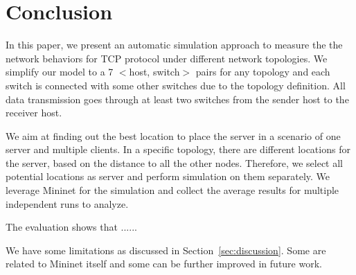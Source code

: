 \section{Conclusion} \label{sec:conclusion}

In this paper, we present an automatic simulation approach to measure the 
the network behaviors for TCP protocol under different network topologies. 
We simplify our model to a 7 $<$host, switch$>$ pairs for any topology and 
each switch is connected with some other switches due to the topology definition.
All data transmission goes through at least two switches from the sender 
host to the receiver host. 

We aim at finding out the best location to place the server in a scenario of one server 
and multiple clients. In a specific topology, there are different locations
for the server, based on the distance to all the other nodes. Therefore, we 
select all potential locations as server and perform simulation on them separately.
We leverage Mininet for the simulation and collect the average results 
for multiple independent runs to analyze. 

The evaluation shows that ......

We have some limitations as discussed in Section~\ref{sec:discussion}. Some 
are related to Mininet itself and some can be further improved in future work.
